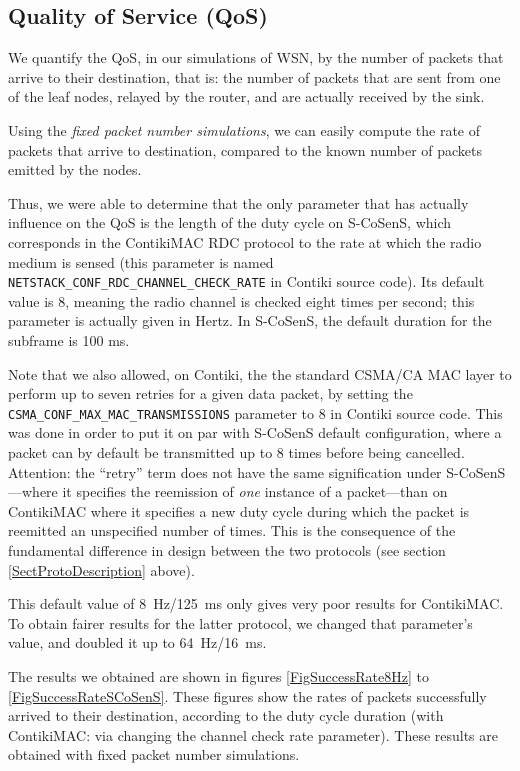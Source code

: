 \documentclass[a4paper,twoside]{article}
\begin{document}
\subsection{Quality of Service (QoS)}

We quantify the QoS, in our simulations of WSN, by the number of packets
that arrive to their destination, that is: the number of packets that are
sent from one of the leaf nodes, relayed by the router, and are actually
received by the sink.

Using the \emph{fixed packet number simulations}, we can easily compute the
rate of packets that arrive to destination, compared to the known number
of packets emitted by the nodes.

Thus, we were able to determine that the only parameter that has actually
influence on the QoS is the length of the duty cycle on S-CoSenS, which
corresponds in the ContikiMAC RDC protocol to the rate at which the radio
medium is sensed (this parameter is named
\texttt{NETSTACK\_CONF\_RDC\_CHANNEL\_CHECK\_RATE} in Contiki source code).
Its default value is 8, meaning the radio channel is checked eight times
per second; this parameter is actually given in Hertz.
In S-CoSenS, the default duration for the subframe is 100 ms.

Note that we also allowed, on Contiki, the the standard CSMA/CA MAC layer
to perform up to seven retries for a given data packet, by setting the
\texttt{CSMA\_CONF\_MAX\_MAC\_TRANSMISSIONS}
parameter to 8 in Contiki source code. This was done in order to put it
on par with S-CoSenS default configuration, where a packet can by default
be transmitted up to 8 times before being cancelled.
Attention: the ``retry'' term does not have the same signification
under S-CoSenS---where it specifies the reemission of \emph{one} instance of
a packet---than on ContikiMAC where it specifies a new duty cycle during
which the packet is reemitted an unspecified number of times. This is
the consequence of the fundamental difference in design between the two
protocols (see section \ref{SectProtoDescription} above).

This default value of 8~Hz/125~ms only gives very poor results for ContikiMAC.
To obtain fairer results for the latter protocol, we changed that parameter's
value, and doubled it up to 64~Hz/16~ms.

The results we obtained are shown in figures \ref{FigSuccessRate8Hz} to
\ref{FigSuccessRateSCoSenS}. These figures show the rates of packets
successfully arrived to their destination, according to the duty cycle
duration (with ContikiMAC: via changing the channel check rate parameter).
These results are obtained with fixed packet number simulations.
\end{document}
